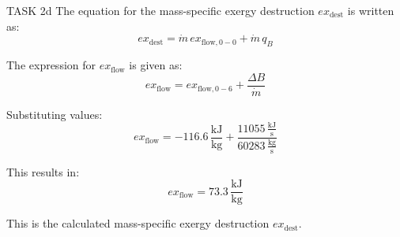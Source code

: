TASK 2d  
The equation for the mass-specific exergy destruction \( ex_{\text{dest}} \) is written as:  
\[
ex_{\text{dest}} = \dot{m} \, ex_{\text{flow},0-0} + \dot{m} \, q_B
\]  

The expression for \( ex_{\text{flow}} \) is given as:  
\[
ex_{\text{flow}} = ex_{\text{flow},0-6} + \frac{\Delta B}{\dot{m}}
\]  

Substituting values:  
\[
ex_{\text{flow}} = -116.6 \, \frac{\text{kJ}}{\text{kg}} + \frac{11055 \, \frac{\text{kJ}}{\text{s}}}{60283 \, \frac{\text{kg}}{\text{s}}}
\]  

This results in:  
\[
ex_{\text{flow}} = 73.3 \, \frac{\text{kJ}}{\text{kg}}
\]  

This is the calculated mass-specific exergy destruction \( ex_{\text{dest}} \).